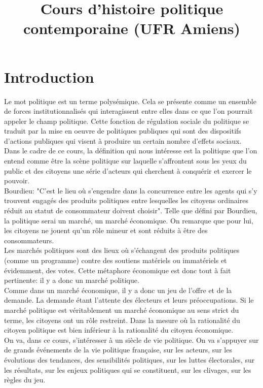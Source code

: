 \documentclass[10pt, a4paper, openany]{book}
\date{}
\title{Cours d'histoire politique contemporaine (UFR Amiens)}
\begin{document}
\maketitle
\tableofcontents

\chapter{Introduction}

Le mot politique est un terme polysémique. Cela se présente comme un ensemble de forces institutionnalisés qui interagissent entre elles dans ce que l'on pourrait appeler le champ politique. Cette fonction de régulation sociale du politique se traduit par la mise en oeuvre de politiques publiques qui sont des dispositifs d'actions publiques qui visent à produire un certain nombre d'effets sociaux. \\
Dans le cadre de ce cours, la définition qui nous intéresse est la politique que l'on entend comme être la scène politique sur laquelle s'affrontent sous les yeux du public et des citoyens une série d'acteurs qui cherchent à conquérir et exercer le pouvoir. \\
Bourdieu: "C'est le lieu où s'engendre dans la concurrence entre les agents qui s'y trouvent engagés des produits politiques entre lesquelles les citoyens ordinaires réduit au statut de consommateur doivent choisir". Telle que défini par Bourdieu, la politique serai un marché, un marché économique. On remarque que pour lui, les citoyens ne jouent qu'un rôle mineur et sont réduits à être des consommateurs. \\
Les marchés politiques sont des lieux où s'échangent des produits politiques (comme un programme) contre des soutiens matériels ou immatériels et évidemment, des votes. Cette métaphore économique est donc tout à fait pertinente: il y a donc un marché politique. \\
Comme dans un marché économique, il y a donc un jeu de l'offre et de la demande. La demande étant l'attente des électeurs et leurs préoccupations. Si le marché politique est véritablement un marché économique au sens strict du terme, les citoyens ont un rôle restreint. Dans la mesure où la rationalité du citoyen politique est bien inférieur à la rationalité du citoyen économique. \\
On va, dans ce cours, s'intéresser à un siècle de vie politique. On va s'appuyer sur de grands événements de la vie politique française, sur les acteurs, sur les évolutions des tendances, des sensibilités politiques, sur les luttes électorales, sur les résultats, sur les enjeux politiques qui se constituent, sur les clivages, sur les règles du jeu.
\end{document}
